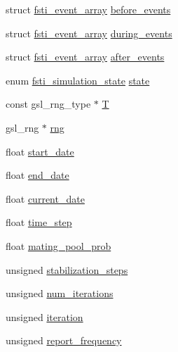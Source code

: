 \begin{DoxyCompactItemize}
\item 
struct \mbox{\hyperlink{structfsti__event__array}{fsti\+\_\+event\+\_\+array}} \mbox{\hyperlink{structfsti__simulation_afdc6cdfba5f8f8a1d72a1c2e1b2775c0}{before\+\_\+events}}
\item 
struct \mbox{\hyperlink{structfsti__event__array}{fsti\+\_\+event\+\_\+array}} \mbox{\hyperlink{structfsti__simulation_ad5f30f66f41c8bd1bb6c12fa2d254132}{during\+\_\+events}}
\item 
struct \mbox{\hyperlink{structfsti__event__array}{fsti\+\_\+event\+\_\+array}} \mbox{\hyperlink{structfsti__simulation_aeecb9bdd114d396d70dcb274eada625c}{after\+\_\+events}}
\item 
enum \mbox{\hyperlink{fsti-simulation_8h_aa4feb4e18e0a72b142f028a7ddf75047}{fsti\+\_\+simulation\+\_\+state}} \mbox{\hyperlink{structfsti__simulation_a235faa3cc9ec5bd16cd89fa80cdadff5}{state}}
\item 
const gsl\+\_\+rng\+\_\+type $\ast$ \mbox{\hyperlink{structfsti__simulation_a9d284bb9be88b621ec2449d02df614dd}{T}}
\item 
gsl\+\_\+rng $\ast$ \mbox{\hyperlink{structfsti__simulation_a3f669aaba3da7bd5a46a4cb8e7c009ce}{rng}}
\item 
float \mbox{\hyperlink{structfsti__simulation_ac5ce36734a8156fec0cf62bcaa56f5a3}{start\+\_\+date}}
\item 
float \mbox{\hyperlink{structfsti__simulation_a5bddb8a23f894397915c43a5770e7fd1}{end\+\_\+date}}
\item 
float \mbox{\hyperlink{structfsti__simulation_a79f4bbb55b32e131cafcdb6697ab4768}{current\+\_\+date}}
\item 
float \mbox{\hyperlink{structfsti__simulation_a650011fbab62704c39b65cdd8cdb3a3d}{time\+\_\+step}}
\item 
float \mbox{\hyperlink{structfsti__simulation_a35c0d7aba210250a4b0d834ed6dfe5c6}{mating\+\_\+pool\+\_\+prob}}
\item 
unsigned \mbox{\hyperlink{structfsti__simulation_aaddd9220a10295d24f5c6a50f7f1727c}{stabilization\+\_\+steps}}
\item 
unsigned \mbox{\hyperlink{structfsti__simulation_a5ec800c5ca8fb82bbdbe45743a3571a9}{num\+\_\+iterations}}
\item 
unsigned \mbox{\hyperlink{structfsti__simulation_a1455e197a5df3af32d96438c784d0bd5}{iteration}}
\item 
unsigned \mbox{\hyperlink{structfsti__simulation_a933d795a18a61dccea12db86da0e120b}{report\+\_\+frequency}}
\item 

\end{DoxyCompactItemize}
